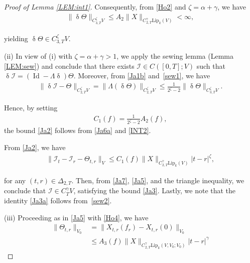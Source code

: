\documentclass[letterpaper, 11pt,  reqno]{amsart}
\DeclareMathOperator{\Id}{Id}
\newcommand{\1}{\hspace{0.5mm}\text{I}\hspace{0.5mm}}
\newcommand{\I}{\mathcal{I}}
\newcommand{\noi}{\noindent}
\newcommand{\al}{\alpha}
\newcommand{\updl}{\updelta}
\newcommand{\Dl}{\Delta}
\newcommand{\g}{\gamma}
\newcommand{\Lip}{\mathrm{Lip}}
\newcommand{\z}{\zeta}
\numberwithin{equation}{section}
\numberwithin{theorem}{section}
\begin{document}
\begin{proof}[Proof of Lemma \ref{LEM:int1}]
\noi
Consequently, 
from \eqref{Ho2}
and $\z = \al + \g$, 
we have 
\begin{align}
\label{INT2}
\|\updl \Theta\|_{C^\z_{3,T} V}
\leq A_2
\|X\|_{C^\g_{2,T}\Lip_k(V)}
<\infty,
\end{align}


\noi
yielding 
 $\updl \Theta \in C^\z_{3,T}  V$.





\medskip

\noi
(ii)
In view of (i) with $\z = \al + \g > 1$, 
we apply the sewing lemma (Lemma \ref{LEM:sew})
and conclude that 
there exists $\I\in C([0,T]; V)$ 
such that 
$\updl \I = (\Id - \Lambda \updl)\Theta$. 
Moreover, from \eqref{Ja1b} and~\eqref{sew1}, we have 
\begin{align}
\label{Ja6a}
\| \updl \I - \Theta \|_{C^\z _{2,T} V} 
= \|   \Lambda (\updl \Theta) \|_{C^\z _{2,T} V} 
\leq \frac{1}{2^\z -2} 
\|\updl \Theta\|_{C^\z _{3,T} V}.
\end{align} 



\noi
Hence, 
by  setting 
\begin{align}
C_1(f)  = \frac{1}{2^\z -2} A_2(f),
\label{Ja6aa} 
\end{align}
the bound \eqref{Ja2}
follows from \eqref{Ja6a}
and 
 \eqref{INT2}.

 
 
 
From 
\eqref{Ja2}, we have 
\begin{align}
\label{Ja7}
\|\I_t - \I_r - \Theta_{t,r}\|_{ V}
\leq C_1(f)
\|X\|_{C^\g_{2,T}\Lip_k(V)}|t-r|^{\z},
\end{align}

\noi
for any  $(t,r)\in \Dl_{2,T}$.
Then, from \eqref{Ja7}, \eqref{Ja5}, 
and the triangle inequality, 
we conclude that 
 $\I\in C^\g_T  V$, satisfying the bound
 \eqref{Ja3}.
Lastly, we note that 
the identity \eqref{Ja3a} follows from~\eqref{sew2}.



\medskip

\noi
(iii)
Proceeding as in \eqref{Ja5}
with \eqref{Ho4}, we have 
\begin{equation}
\begin{aligned}
\|\Theta_{t,r}\|_{V_0} 
& =\|X_{t,r}(f_r)-X_{t,r}(0)\|_{ V_0}\\
& \leq A_3(f) \|X\|_{C^\g_{2,T}\Lip_k(V, V_0; V_0)} |t-r|^\g 
\end{aligned}
\label{Jaa5}
\end{equation}



\end{proof}
\end{document}
